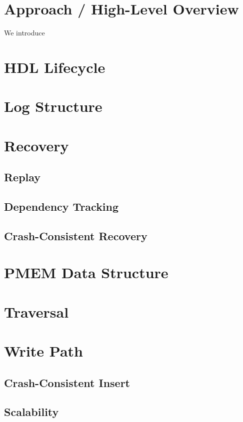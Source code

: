 \documentclass[12pt,a4paper,twoside]{book}
\begin{document}
\section{Approach / High-Level Overview}
We introduce 
\section{HDL Lifecycle}
\section{Log Structure}
\section{Recovery}
\subsection{Replay}
\subsection{Dependency Tracking}
\subsection{Crash-Consistent Recovery}
\section{PMEM Data Structure}
\section{Traversal}
\section{Write Path}
\subsection{Crash-Consistent Insert}
\subsection{Scalability}
\end{document}
